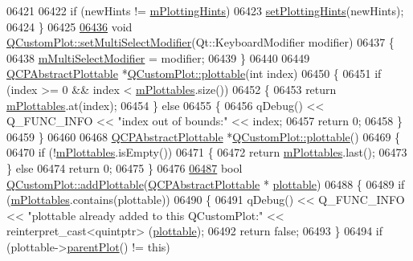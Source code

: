 \begin{DoxyCode}
06421   
06422   \textcolor{keywordflow}{if} (newHints != \hyperlink{a00116_af6de5d56e261af21cf6223179fc58883}{mPlottingHints})
06423     \hyperlink{a00116_a94a33cbdadbbac5934843508bcfc210d}{setPlottingHints}(newHints);
06424 \}
06425 
\hypertarget{a00115_source_l06436}{}\hyperlink{a00116_a8fc96e3b5138a06759a2a90c166df516}{06436} \textcolor{keywordtype}{void} \hyperlink{a00116_a8fc96e3b5138a06759a2a90c166df516}{QCustomPlot::setMultiSelectModifier}(Qt::KeyboardModifier modifier)
06437 \{
06438   \hyperlink{a00116_a690dbabf892af5969b09e9f69bb83a9b}{mMultiSelectModifier} = modifier;
06439 \}
06440 
06449 \hyperlink{a00024}{QCPAbstractPlottable} *\hyperlink{a00116_a5c198d46ea2a2255a1b73e2c590f0364}{QCustomPlot::plottable}(\textcolor{keywordtype}{int} index)
06450 \{
06451   \textcolor{keywordflow}{if} (index >= 0 && index < \hyperlink{a00116_a57ed6eb2e0a767a8344de45110a3e81d}{mPlottables}.size())
06452   \{
06453     \textcolor{keywordflow}{return} \hyperlink{a00116_a57ed6eb2e0a767a8344de45110a3e81d}{mPlottables}.at(index);
06454   \} \textcolor{keywordflow}{else}
06455   \{
06456     qDebug() << Q\_FUNC\_INFO << \textcolor{stringliteral}{"index out of bounds:"} << index;
06457     \textcolor{keywordflow}{return} 0;
06458   \}
06459 \}
06460 
06468 \hyperlink{a00024}{QCPAbstractPlottable} *\hyperlink{a00116_a5c198d46ea2a2255a1b73e2c590f0364}{QCustomPlot::plottable}()
06469 \{
06470   \textcolor{keywordflow}{if} (!\hyperlink{a00116_a57ed6eb2e0a767a8344de45110a3e81d}{mPlottables}.isEmpty())
06471   \{
06472     \textcolor{keywordflow}{return} \hyperlink{a00116_a57ed6eb2e0a767a8344de45110a3e81d}{mPlottables}.last();
06473   \} \textcolor{keywordflow}{else}
06474     \textcolor{keywordflow}{return} 0;
06475 \}
06476 
\hypertarget{a00115_source_l06487}{}\hyperlink{a00116_ab7ad9174f701f9c6f64e378df77927a6}{06487} \textcolor{keywordtype}{bool} \hyperlink{a00116_ab7ad9174f701f9c6f64e378df77927a6}{QCustomPlot::addPlottable}(\hyperlink{a00024}{QCPAbstractPlottable} *
      \hyperlink{a00116_a5c198d46ea2a2255a1b73e2c590f0364}{plottable})
06488 \{
06489   \textcolor{keywordflow}{if} (\hyperlink{a00116_a57ed6eb2e0a767a8344de45110a3e81d}{mPlottables}.contains(plottable))
06490   \{
06491     qDebug() << Q\_FUNC\_INFO << \textcolor{stringliteral}{"plottable already added to this QCustomPlot:"} << \textcolor{keyword}{reinterpret\_cast<}quintptr\textcolor{keyword}{>}
      (\hyperlink{a00116_a5c198d46ea2a2255a1b73e2c590f0364}{plottable});
06492     \textcolor{keywordflow}{return} \textcolor{keyword}{false};
06493   \}
06494   \textcolor{keywordflow}{if} (plottable->\hyperlink{a00044_ab7e0e94461566093d36ffc0f5312b109}{parentPlot}() != \textcolor{keyword}{this})

\end{DoxyCode}
